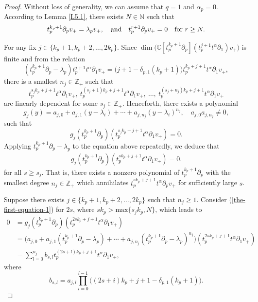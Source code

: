 \documentclass[10pt,a4paper]{amsart}
\newcommand{\N}{\mathbb N}
\newcommand{\Z}{\mathbb Z}
\begin{document}
\begin{proof}
Without loss of  generality, we can assume that $q=1$ and $\alpha_p=0$.
According to Lemma \ref{L5.1}, there exists $N\in\N$ such that 
\[\aligned
 t_{p}^{k_{p}+1}\partial_{p}v_+=\lambda_pv_+ ,\quad \text{and}\quad
t_{p}^{r +1}\partial_{p}v_+=0\quad \text{for} \ r \geq N.
\endaligned\]


	For any fix $j\in\{k_p+1,k_p+2,\dots,2k_p\}$. Since $\dim \big(\mathbb{C}[t_{p}^{k_p+1}\partial_{p}](t_{p}^{j+1}t^{\alpha}\partial_{1})v_+
\big) $ is finite and from the relation
	\[(t_{p}^{k_p+1}\partial_{p}-\lambda_{p})t_{p}^{j+1}t^{\alpha}\partial_{1}v_+=
	\big(j+1-\delta_{p,1}(k_p+1)\big)t_{p}^{k_p+j+1}t^{\alpha}\partial_{1}v_+,\]
	there is a smallest $n_{j}\in\Z_{+}$ such that
	\[t_{p}^{s_{j}k_p+j+1}t^{\alpha}\partial_{1}v_+,\ t_{p}^{(s_{j}+1)k_p+j+1}t^{\alpha}\partial_{1}v_+,\ \dots,\ t_{p}^{(s_{j}+n_{j})k_p+j+1}t^{\alpha}\partial_{1}v_+\]
	are linearly dependent for some $s_{j}\in\Z_{+}$. Henceforth, there exists a polynomial
	\[g_{j}(y)=a_{j,0}+a_{j,1}(y-\lambda_{i})+\cdots+a_{j,n_{j}}(y-\lambda_{i})^{n_{j}},\quad a_{j,0}a_{j,n_{j}}\neq0,\]
	such that
	\[g_{j}(t_{p}^{k_p+1}\partial_{p})(t_{p}^{s_{j}k_p+j+1}t^{\alpha}\partial_{1}v_+)=0.\]
	Applying $t_{p}^{k_p+1}\partial_{p}-\lambda_{p}$ to the equation above repeatedly, we deduce that
	\begin{align}\label{the-first-equation-1}
		g_{j}(t_{p}^{k_p+1}\partial_{p})(t_{p}^{sk_p+j+1}t^{\alpha}\partial_{1}v_+)=0.
	\end{align}
	for all $s\geq s_{j}$. That is, there exists a nonzero polynomial of $t_{p}^{k_p+1}\partial_{p}$ with the smallest degree $n_{j}\in\Z_{+}$
	which annihilates $t_{p}^{sk_p+j+1}t^{\alpha}\partial_{p}v_+$ for sufficiently large $s$.
	
	Suppose there exists $j\in\{k_p+1,k_p+2,\dots,2k_p\}$ such that $n_{j}\geq1$. Consider (\ref{the-first-equation-1})
	for $2s$, where $sk_p> \text{max}\{s_{j}k_p,N\} $, which leads to
	\begin{align*}
	0&=g_{j}(t_{p}^{k_p+1}\partial_{p})(t_{p}^{2s{k_p}+j+1}t^{\alpha}\partial_{1}v_+)\\
	&=\big(a_{j,0}+a_{j,1}\left(t_{p}^{k_p+1}\partial_{p}-\lambda_{p}\right)+\cdots+a_{j,n_{j}}\left(t_{p}^{k_p+1}\partial_{p}-\lambda_{p}\right)^{n_{j}}\big) (t_{p}^{2sk_p+j+1}t^{\alpha}\partial_{1}v_+)\\
	&=\sum_{l=0}^{n_{j}}b_{s,l}t_p^{(2s+l)k_p+j+1}t^{\alpha}\partial_1v_+,
\end{align*}
where
\begin{equation*}
	b_{s,l}=a_{j,l}\prod_{i=0}^{l-1}\big((2s+i)k_p+j+1-\delta_{p,1}(k_p+1)\big).
\end{equation*}
	

\end{proof}
\end{document}
